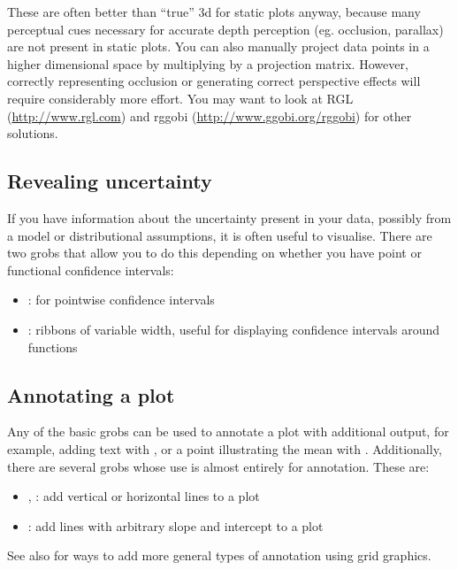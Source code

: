 These are often better than ``true'' 3d for static plots anyway, because many perceptual cues necessary for accurate depth perception (eg. occlusion, parallax) are not present in static plots.  You can also manually project data points in a higher dimensional space by multiplying by a projection matrix.  However, correctly representing occlusion or generating correct perspective effects will require considerably more effort.  You may want to look at RGL (\url{http://www.rgl.com}) and rggobi (\url{http://www.ggobi.org/rggobi}) for other solutions.

\subsection{Revealing uncertainty}\label{sub:displaying_uncertainty}

If you have information about the uncertainty present in your data, possibly from a model or distributional assumptions, it is often useful to visualise.  There are two grobs that allow you to do this depending on whether you have point or functional confidence intervals:

\begin{itemize}
	\item {}: for pointwise confidence intervals
	\item {}: ribbons of variable width, useful for displaying confidence intervals around functions
\end{itemize}

\subsection{Annotating a plot}\label{sub:annotating_a_plot}

Any of the basic grobs can be used to annotate a plot with additional output, for example, adding text with , or a point illustrating the mean with .  Additionally, there are several grobs whose use is almost entirely for annotation.  These are:

\begin{itemize}
	\item {}, : add vertical or horizontal lines to a plot
	\item {}: add lines with arbitrary slope and intercept to a plot
\end{itemize}

See also  for ways to add more general types of annotation using grid graphics.

